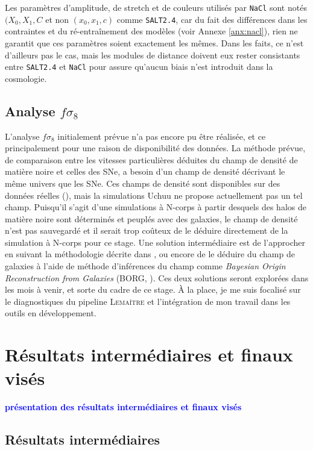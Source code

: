 \documentclass{book}
\newcommand{\consignes}[1]{{\textcolor{blue}{\bf \large #1}}}
\def\lemaitre{\textsc{Lemaître}\xspace}
\def\nacl{\texttt{NaCl}\xspace}
\def\saltd{\texttt{SALT2.4}\xspace}
\begin{document}
Les paramètres d'amplitude, de stretch et de couleurs utilisés par \nacl sont notés $(X_0, X_1, C$ et non $(x_0, x_1, c)$ comme \saltd, car du fait des différences dans les contraintes et du ré-entraînement des modèles (voir Annexe \ref{anx:nacl}), rien ne garantit que ces paramètres soient exactement les mêmes. Dans les faits, ce n'est d'ailleurs pas le cas, mais les modules de distance doivent eux rester consistants entre \saltd et \nacl pour assure qu'aucun biais n'est introduit dans la cosmologie.


\subsection{Analyse $f\sigma_8$}
\label{sec:res_fs8}
L'analyse $f\sigma_8$ initialement prévue n'a pas encore pu être réalisée, et ce principalement pour une raison de disponibilité des données. La méthode prévue, de comparaison entre les vitesses particulières déduites du champ de densité de matière noire et celles des SNe, a besoin d'un champ de densité décrivant le même univers que les SNe. Ces champs de densité sont disponibles sur des données réelles (\cite{carrick_cosmological_2015}), mais la simulations Uchuu ne propose actuellement pas un tel champ. Puisqu'il s'agit d'une simulations à N-corps à partir desquels des halos de matière noire sont déterminés et peuplés avec des galaxies, le champ de densité n'est pas sauvegardé et il serait trop coûteux de le déduire directement de la simulation à N-corps pour ce stage. Une solution intermédiaire est de l'approcher en suivant la méthodologie décrite dans \cite{carrick_cosmological_2015}, ou encore de le déduire du champ de galaxies à l'aide de méthode d'inférences du champ comme \textit{Bayesian Origin Reconstruction from Galaxies} (BORG, \cite{jasche_physical_2019}). Ces deux solutions seront explorées dans les mois à venir, et sorte du cadre de ce stage. À la place, je me suis focalisé sur le diagnostiques du pipeline \lemaitre et l'intégration de mon travail dans les outils en développement.


\section{Résultats intermédiaires et finaux visés}
\consignes{présentation des résultats intermédiaires et finaux visés}

\subsection{Résultats intermédiaires}
\end{document}
